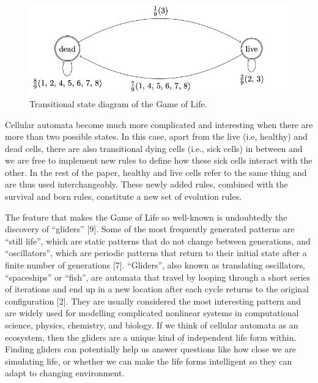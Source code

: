 \documentclass[12pt]{article}
\numberwithin{figure}{section} %
\begin{document}
\begin{figure}[!htb]
\centering
\includegraphics[width=\linewidth]{Section1/3}
\caption{Transitional state diagram of the Game of Life.}
\end{figure}

Cellular automata become much more complicated and interesting when there are more than two possible states. In this case, apart from the live (i.e, healthy) and dead cells, there are also transitional dying cells (i.e., sick cells) in between and we are free to implement new rules to define how these sick cells interact with the other. In the rest of the paper, healthy and live cells refer to the same thing and are thus used interchangeably. These newly added rules, combined with the survival and born rules, constitute a new set of evolution rules. 

The feature that makes the Game of Life so well-known is undoubtedly the discovery of “gliders” [9]. Some of the most frequently generated patterns are “still life”, which are static patterns that do not change between generations, and “oscillators”, which are periodic patterns that return to their initial state after a finite number of generations [7]. “Gliders”, also known as translating oscillators, “spaceships” or “fish”, are automata that travel by looping through a short series of iterations and end up in a new location after each cycle returns to the original configuration [2]. They are usually considered the most interesting pattern and are widely used for modelling complicated nonlinear systems in computational science, physics, chemistry, and biology. If we think of cellular automata as an ecosystem, then the gliders are a unique kind of independent life form within. Finding gliders can potentially help us answer questions like how close we are simulating life, or whether we can make the life forms intelligent so they can adapt to changing environment. 
\end{document}
